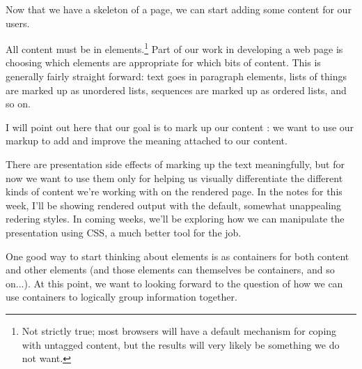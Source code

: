 \startsection[title={Introduction}]

Now that we have a skeleton of a page, we can start adding some content for our users.

All content must be in elements.\footnote{Not strictly true; most browsers will have a default mechanism for coping with untagged content, but the results will very likely be something we do not want.} Part of our work in developing a web page is choosing which elements are appropriate for which bits of content. This is generally fairly straight forward: text goes in paragraph elements, lists of things are marked up as unordered lists, sequences are marked up as ordered lists, and so on.

I will point out here that our goal is to mark up our content : we want to use our markup to add and improve the meaning attached to our content. 

There are presentation side effects of marking up the text meaningfully, but for now we want to use them only for helping us visually differentiate the different kinds of content we're working with on the rendered page. In the notes for this week, I'll be showing rendered output with the default, somewhat unappealing redering styles. In coming weeks, we'll be exploring how we can manipulate the presentation using CSS, a much better tool for the job.

One good way to start thinking about elements is as containers for both content and other elements (and those elements can themselves be containers, and so on...). At this point, we want to looking forward to the question of how we can use containers to logically group information together.

\stopsection